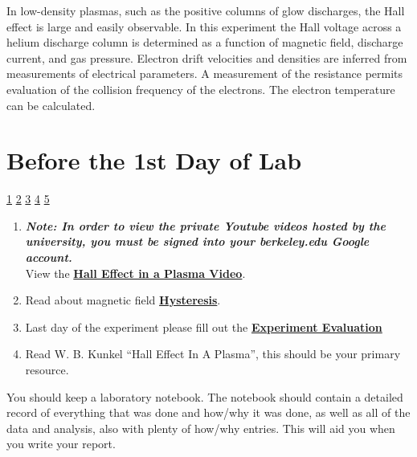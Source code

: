 \documentclass{../lab}
\begin{document}
In low-density plasmas, such as the positive columns of glow discharges, the Hall effect is large and easily observable. In this experiment the Hall voltage across a helium discharge column is determined as a function of magnetic field, discharge current, and gas pressure. Electron drift velocities and densities are inferred from measurements of electrical parameters. A measurement of the resistance permits evaluation of the collision frequency of the electrons. The electron temperature can be calculated.

\section{Before the 1st Day of Lab}
\label{sec:BeforeFirstDay}

\signatures \hyperlink{Mean Electron Energy}{ 1} \hyperlink{Stable Plasma Flow}{ 2} \hyperlink{Valves and Probes}{ 3} \hyperlink{Shut Off the System Completely}{ 4} \hyperlink{Hall Electric Field vs. Magnetic Field Plots}{ 5} 

\begin{enumerate}
    \item \emph{\textbf{Note: In order to view the private Youtube videos hosted by the university, you must be signed into your berkeley.edu Google account.}} \\
    View the \href{http://youtu.be/iZkOlZDyb2U}{\textbf{Hall Effect in a Plasma Video}}.

    \item Read about magnetic field \href{https://berkeley-physics111b.github.io/appendices/hysteresis/}{\textbf{Hysteresis}}.

    \item Last day of the experiment please fill out the \href{\ExperimentEvaluation}{\textbf{Experiment Evaluation}}

    \item Read W. B. Kunkel ``Hall Effect In A Plasma'', this should be your primary resource.

\end{enumerate}


You should keep a laboratory notebook. The notebook should contain a detailed record of everything that was done and how/why it was done, as well as all of the data and analysis, also with plenty of how/why entries. This will aid you when you write your report.
\end{document}
